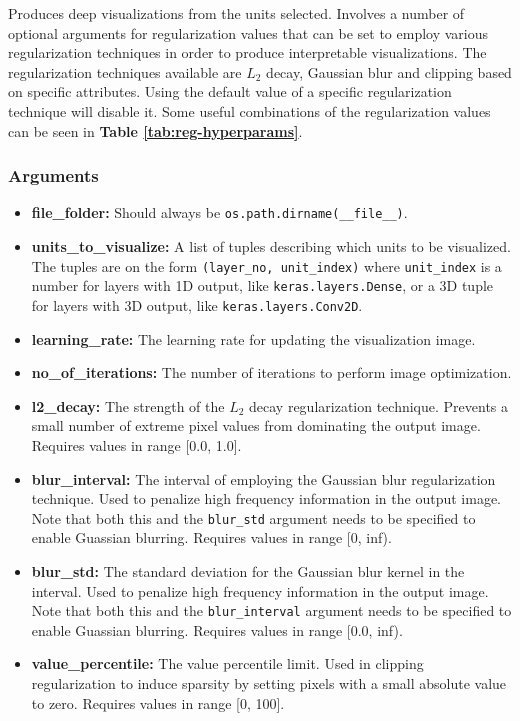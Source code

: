 \noindent Produces deep visualizations from the units selected. Involves a number of optional arguments for regularization values that can be set to employ various regularization techniques in order to produce interpretable visualizations. The regularization techniques available are $L_2$ decay, Gaussian blur and clipping based on specific attributes. Using the default value of a specific regularization technique will disable it. Some useful combinations of the regularization values can be seen in \textbf{Table \ref{tab:reg-hyperparams}}.

\subsubsection{Arguments}

\begin{itemize}
    \item \textbf{file\_folder:} Should always be \texttt{os.path.dirname(\_\_file\_\_)}.
    \item \textbf{units\_to\_visualize:} A list of tuples describing which units to be visualized. The tuples are on the form \texttt{(layer\_no, unit\_index)} where \texttt{unit\_index} is a number for layers with 1D output, like \texttt{keras.layers.Dense}, or a 3D tuple for layers with 3D output, like \texttt{keras.layers.Conv2D}.
    \item \textbf{learning\_rate:} The learning rate for updating the visualization image.
    \item \textbf{no\_of\_iterations:} The number of iterations to perform image optimization.
    \item \textbf{l2\_decay:} The strength of the $L_2$ decay regularization technique. Prevents a small number of extreme pixel values from dominating the output image. Requires values in range [0.0, 1.0].
    \item \textbf{blur\_interval:} The interval of employing the Gaussian blur regularization technique. Used to penalize high frequency information in the output image. Note that both this and the \texttt{blur\_std} argument needs to be specified to enable Guassian blurring. Requires values in range [0, inf).
    \item \textbf{blur\_std:} The standard deviation for the Gaussian blur kernel in the interval. Used to penalize high frequency information in the output image. Note that both this and the \texttt{blur\_interval} argument needs to be specified to enable Guassian blurring. Requires values in range [0.0, inf).
    \item \textbf{value\_percentile:} The value percentile limit. Used in clipping regularization to induce sparsity by setting pixels with a small absolute value to zero. Requires values in range [0, 100].

\end{itemize}
